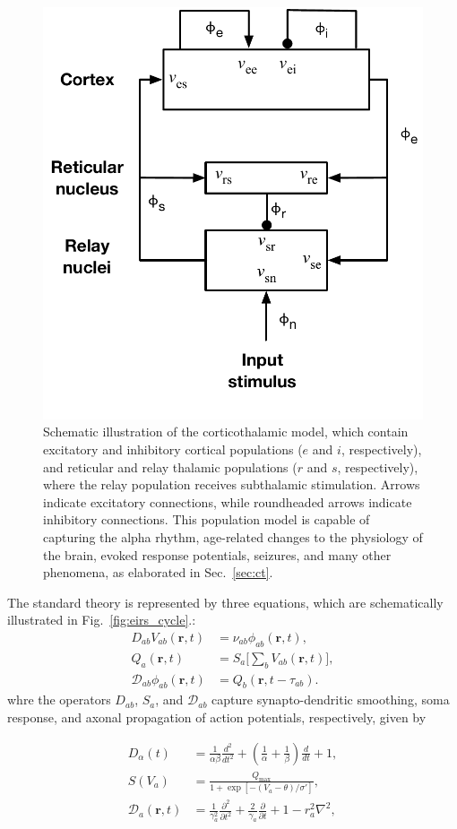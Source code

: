 \documentclass[preprint,review,10pt,authoryear,letterpaper]{elsarticle}
\begin{document}
\begin{figure}[ht]
\begin{center}
\includegraphics[width=0.50\columnwidth]{EIRS_clean}
\caption{Schematic illustration of the corticothalamic model, which contain excitatory and inhibitory cortical populations (\(e\) and \(i\), respectively), and reticular and relay thalamic populations (\(r\) and \(s\), respectively), where the relay population receives subthalamic stimulation. Arrows indicate excitatory connections, while roundheaded arrows indicate inhibitory connections. This population model is capable of capturing the alpha rhythm, age-related changes to the physiology of the brain, evoked response potentials, seizures, and many other phenomena, as elaborated in Sec.~\ref{sec:ct}.}
\label{fig:ct_schematic}
\end{center}
\end{figure}

The standard theory \citep{Robinson2005} is represented by three equations, which are schematically illustrated in Fig.~\ref{fig:eirs_cycle}.:
\begin{align}
	D_{ab}V_{ab}(\mathbf{r},t) &= \nu_{ab}\phi_{ab}(\mathbf{r},t),\\
			Q_a(\mathbf{r},t) &= S_a \big[\sum_b V_{ab}(\mathbf{r},t) \big],\\
	\mathcal{D}_{ab}\phi_{ab}(\mathbf{r},t) &= Q_b(\mathbf{r},t-\tau_{ab}).
\end{align}
whre the operators \(D_{ab}\), \(S_{a}\), and \(\mathcal{D}_{ab}\) capture synapto-dendritic smoothing, soma response, and axonal propagation of action potentials, respectively, given by

\begin{align}
	D_\alpha(t) &= \frac{1}{\alpha\beta}\frac{d^2}{dt^2} + \left( \frac{1}{\alpha} + \frac{1}{\beta}\right) \frac{d}{dt}+1,\\
	S(V_a) &= \frac{Q_{\textrm{max}}}{1+\exp[-(V_a - \theta)/\sigma']},\\
	\mathcal{D}_a(\mathbf{r},t) &= \frac{1}{\gamma_a^2}\frac{\partial^2}{\partial t^2} + \frac{2}{\gamma_a}\frac{\partial}{\partial t} + 1 - r_a^2\nabla^2,
\end{align}
\end{document}
